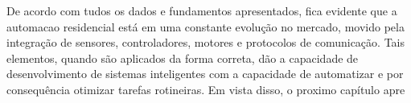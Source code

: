     De acordo com tudos os dados e fundamentos apresentados, fica evidente que a automacao residencial está em uma constante evolução no mercado, movido pela integração de sensores, controladores, motores e protocolos de comunicação. Tais elementos, quando são aplicados da forma correta, dão a capacidade de desenvolvimento de sistemas inteligentes com a capacidade de automatizar e por consequência otimizar tarefas rotineiras. Em vista disso, o proximo capítulo apre